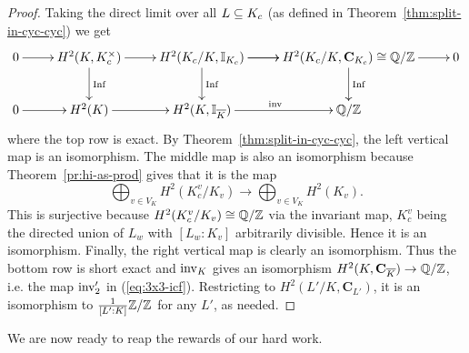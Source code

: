 \begin{proof}
Taking the direct limit over all $L\subseteq K_c$ (as defined in Theorem~\ref{thm:split-in-cyc-cyc}) we get 
\[
\xymatrix{
0\ar[r] &H^2(K,K_c^{\times}) \ar[r] \ar[d]^{\Inf} & H^2(K_c/K, \I_{K_c}) \ar[r] \ar[d]^{\Inf}\ar[r] &  H^2(K_c/K,\mathbf C_{K_c})\cong \Q/\Z \ar[d]^{\Inf}\ar[r]&0\\
0\ar[r] & H^2(K) \ar[r] & H^2(K,\I_{\ol K})\ar[r]^{\inv}& \Q/\Z& 
}
\]
where the top row is exact. By Theorem~\ref{thm:split-in-cyc-cyc}, the left vertical map is an isomorphism. The middle map is also an isomorphism because Theorem~\ref{pr:hi-as-prod} gives that it is the map
\[
\bigoplus_{v\in V_K}H^2(K_c^v/K_v)\to \bigoplus_{v\in V_K} H^2(K_v).
\]
This is surjective because $H^2(K_c^v/K_v)\cong \mathbb{Q}/\mathbb{Z}$ via the invariant map, $K_c^v$ being the directed union of $L_w$ with $[L_w:K_v]$ arbitrarily divisible. Hence it is an isomorphism. Finally, the right vertical map is clearly an isomorphism. Thus the bottom row is short exact and $\operatorname{inv}_K$ gives an isomorphism $H^2(K,\mathbf C_{\overline{K}})\to \mathbb{Q}/\mathbb{Z}$, i.e. the map $\operatorname{inv}_2'$ in (\ref{eq:3x3-icf}). Restricting to $H^2(L'/K,\mathbf C_{L'})$, it is an isomorphism to $\frac{1}{[L':K]}\mathbb{Z}/\mathbb{Z}$ for any $L'$, as needed.
\end{proof}
We are now ready to reap the rewards of our hard work.
